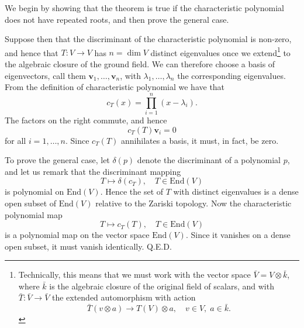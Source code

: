 \documentclass[12pt]{article}
\newcommand{\bv}{\mathbf{v}}
\newcommand{\End}{\mathrm{End}}
\begin{document}
We begin by showing that the theorem is true if the characteristic
polynomial does not have repeated roots,  and then prove the general case.

Suppose then that the discriminant of the characteristic polynomial is
non-zero, and hence that $T:V\rightarrow V$ has $n=\dim V$ distinct
eigenvalues once we extend\footnote{Technically, this means that we must
work with the vector space $\bar{V}=V\otimes\bar{k}$, where $\bar{k}$ is the
algebraic closure of the original field of scalars, and with
$\bar{T}:\bar{V}\to \bar{V}$ the extended automorphism with action
$$\bar{T}(v\otimes a) \to T(V)\otimes a,\quad v\in V,\; a\in \bar{k}.$$} to the algebraic closure of the ground
field.
We can therefore choose a basis of eigenvectors, call them
$\bv_1,\ldots,\bv_n$, with $\lambda_1,\ldots,\lambda_n$ the
corresponding eigenvalues.  From the definition of characteristic
polynomial we have that
$$c_T(x) = \prod_{i=1}^n (x-\lambda_i).$$
The factors on the right commute, and hence
$$c_T(T)\bv_i = 0$$
for all $i=1,\ldots,n$.  Since $c_T(T)$ annihilates a basis, it must, in
fact, be zero.

To prove the general case, let $\delta(p)$ denote the discriminant of
a polynomial $p$, and let us remark that the discriminant mapping
$$
T\mapsto \delta(c_T),\quad T\in\End(V)$$
is polynomial on
$\End(V)$. Hence the set of $T$ with distinct eigenvalues is a dense
open subset of $\End(V)$ relative to the Zariski
topology.  Now the characteristic polynomial map
$$T\mapsto c_T(T),\quad T\in\End(V)$$
is a polynomial map on the vector
space $\End(V)$.  Since it vanishes on a dense
open subset, it must vanish identically. Q.E.D.
\end{document}
